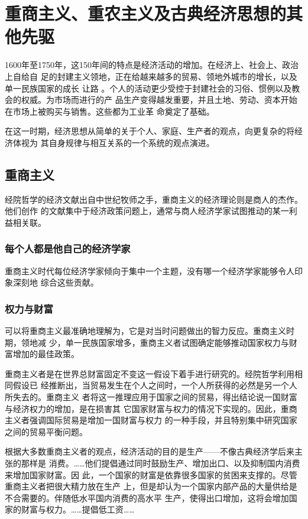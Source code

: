 \chapter{重商主义、重农主义及古典经济思想的其他先驱}

1600年至1750年，这150年间的特点是经济活动的增加。在经济上、社会上、政治上自给自
足的封建主义领地，正在给越来越多的贸易、领地外城市的增长，以及单一民族国家的成长
让路 。个人的活动更少受控于封建社会的习俗、惯例以及教会的权威。为市场而进行的产
品生产变得越发重要，并且土地、劳动、资本开始在市场上被购买与销售。这些都为工业革
命奠定了基础。

在这一时期，经济思想从简单的关于个人、家庭、生产者的观点，向更复杂的将经济体视为
其自身规律与相互关系的一个系统的观点演进。

\section{重商主义}

经院哲学的经济文献出自中世纪牧师之手，重商主义的经济理论则是商人的杰作。他们创作
的文献集中于经济政策问题上，通常与商人经济学家试图推动的某一利益相关联。

\subsection{每个人都是他自己的经济学家}

重商主义时代每位经济学家倾向于集中一个主题，没有哪一个经济学家能够令人印象深刻地
综合这些贡献。

\subsection{权力与财富}

可以将重商主义最准确地理解为，它是对当时问题做出的智力反应。重商主义时期，领地减
少，单一民族国家增多，重商主义者试图确定能够推动国家权力与财富增加的最佳政策。

重商主义者是在世界总财富固定不变这一假设下着手进行研究的。经院哲学利用相同假设已
经推断出，当贸易发生在个人之间时，一个人所获得的必然是另一个人所失去的。重商主义
者将这一推理应用于国家之间的贸易，得出结论说一国财富与经济权力的增加，是在损害其
它国家财富与权力的情况下实现的。因此，重商主义者强调国际贸易是增加一国财富与权力
的一种手段，并且特别集中研究国家之间的贸易平衡问题。

根据大多数重商主义者的观点，经济活动的目的是生产——不像古典经济学后来主张的那样是
消费。……他们提倡通过同时鼓励生产、增加出口、以及抑制国内消费来增加国家财富。因
此，一个国家的财富是依靠很多国家的贫困来支撑的。尽管重商主义者把很大精力放在生产
上，但是却认为一个国家内部产品的大量供给是不合需要的。伴随低水平国内消费的高水平
生产，使得出口增加，这将会增加国家的财富与权力。……提倡低工资……

